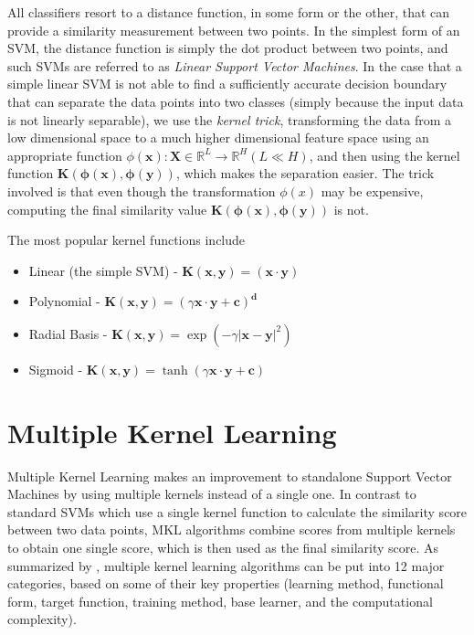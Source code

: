 All classifiers resort to a distance function, in some form or the other, that can provide a similarity measurement between two points. In the simplest form of an SVM, the distance function is simply the dot product between two points, and such SVMs are referred to as \emph{Linear Support Vector Machines}. In the case that a simple linear SVM is not able to find a sufficiently accurate decision boundary that can separate the data points into two classes (simply because the input data is not linearly separable), we use the \emph{kernel trick}, transforming the data from a low dimensional space to a much higher dimensional feature space using an appropriate function $\phi(\mathbf{x}): \mathbf{X} \in \mathbb{R}^{L} \rightarrow \mathbb{R}^H (L \ll H)$, and then using the kernel function $\mathbf{K(\phi(x), \phi(y))}$, which makes the separation easier. The trick involved is that even though the transformation $\phi(x)$ may be expensive, computing the final similarity value $\mathbf{K(\phi(x), \phi(y))}$ is not.

The most popular kernel functions include
\begin{itemize}
    \item{Linear (the simple SVM) - $\mathbf{K(x, y)} = (\mathbf{x} \cdot \mathbf{y})$ }
    \item{Polynomial - $\mathbf{K(x, y)} = (\gamma \mathbf{x} \cdot \mathbf{y} + \mathbf{c})^{\mathbf{d}}$}
    \item{Radial Basis - $\mathbf{K(x, y)} = \exp(-\gamma {| \mathbf{x} - \mathbf{y} |}^{2})$}
    \item{Sigmoid - $\mathbf{K(x, y)} = \tanh(\gamma \mathbf{x} \cdot \mathbf{y} + \mathbf{c})$}
\end{itemize}

\section{Multiple Kernel Learning}
Multiple Kernel Learning makes an improvement to standalone Support Vector Machines by using multiple kernels instead of a single one. In contrast to standard SVMs which use a single kernel function to calculate the similarity score between two data points, MKL algorithms combine scores from multiple kernels to obtain one single score, which is then used as the final similarity score. As summarized by \cite{gonen11a}, multiple kernel learning algorithms can be put into 12 major categories, based on some of their key properties (learning method, functional form, target function, training method, base learner, and the computational complexity).

